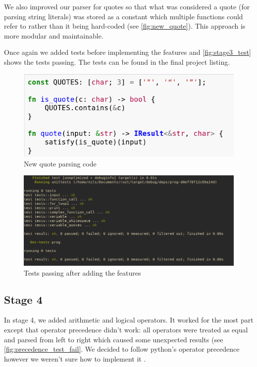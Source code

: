 \documentclass{article}
\begin{document}
We also improved our parser for quotes so that what was considered a quote (for
parsing string literals) was stored as a constant which multiple functions
could refer to rather than it being hard-coded (see \autoref{fig:new_quote}).
This approach is more modular and maintainable.

Once again we added tests before implementing the features and
\autoref{fig:stage3_test} shows the tests passing. The tests can be found in
the final project listing.

\begin{figure}
	\includegraphics[width=\textwidth]{new_quote}
	\caption{New quote parsing code}
	\label{fig:new_quote}
\end{figure}

\begin{figure}
	\includegraphics[width=\textwidth]{stage3_test}
	\caption{Tests passing after adding the features}
	\label{fig:stage3_test}
\end{figure}

\subsection{Stage 4}

In stage 4, we added arithmetic and logical operators. It worked for the most
part except that operator precedence didn't work: all operators were treated as
equal and parsed from left to right which caused some unexpected results (see
\autoref{fig:precedence_test_fail}. We decided to follow python's operator
precedence however we weren't sure how to implement it
\cite{python_precedence}.
\end{document}
